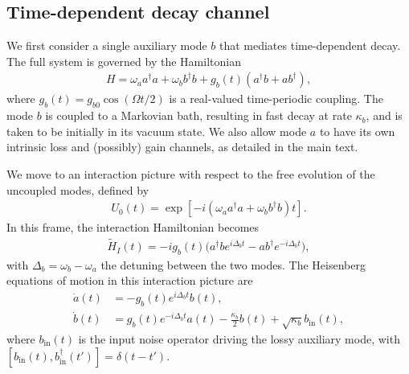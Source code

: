 \documentclass[a4paper,twocolumn,floatfix,10pt,superscriptaddress]%
{quantumarticle}
\begin{document}
\subsection{Time-dependent decay channel}

We first consider a single auxiliary mode $b$ that mediates time-dependent decay. The full system is governed by the Hamiltonian
\begin{align}
H = \omega_a a^\dagger a + \omega_b b^\dagger b +  g_b(t) (a^\dagger b + a b^\dagger),
\end{align}
where $g_b(t) = g_{b0} \cos(\Omega t/2)$ is a real-valued time-periodic coupling. The mode $b$ is coupled to a Markovian bath, resulting in fast decay at rate $\kappa_b$, and is taken to be initially in its vacuum state. We also allow mode $a$ to have its own intrinsic loss and (possibly) gain channels, as detailed in the main text.

We move to an interaction picture with respect to the free evolution of the uncoupled modes, defined by
\begin{align}
U_0(t) = \exp[-i(\omega_a a^\dagger a + \omega_b b^\dagger b)t].
\end{align}
In this frame, the interaction Hamiltonian becomes
\begin{align}
\tilde{H}_I(t) = -i g_b(t) \big(a^\dagger b e^{i \Delta_b t} - a b^\dagger e^{-i \Delta_b t}\big),
\end{align}
with $\Delta_b = \omega_b - \omega_a$ the detuning between the two modes. The Heisenberg equations of motion in this interaction picture are
\begin{align}
\dot{a}(t) &= -g_b(t) e^{i \Delta_b t} b(t), \\
\dot{b}(t) &=  g_b(t) e^{-i \Delta_b t} a(t) - \frac{\kappa_b}{2} b(t) +\sqrt{\kappa_b} b_{\text{in}}(t),
\end{align}
where $b_{\text{in}}(t)$ is the input noise operator driving the lossy auxiliary mode, with
$[b_{\text{in}}(t), b_{\text{in}}^\dagger(t')] = \delta(t - t')$.
\end{document}
